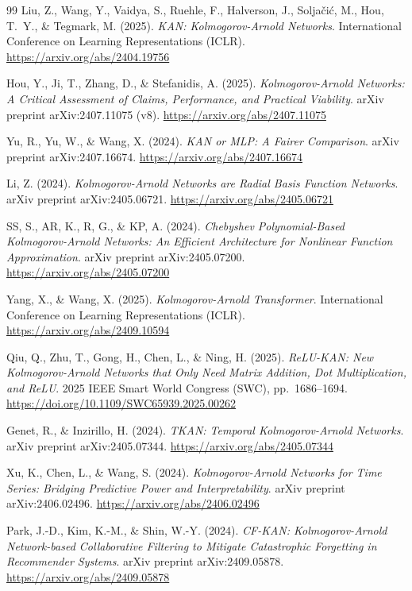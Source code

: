 \documentclass[12pt,a4paper]{report}
\begin{document}
\begin{thebibliography}{99}
Liu, Z., Wang, Y., Vaidya, S., Ruehle, F., Halverson, J., Solja\v{c}i\'{c}, M., Hou, T.~Y., \& Tegmark, M. (2025).
\textit{KAN: Kolmogorov-Arnold Networks}.
International Conference on Learning Representations (ICLR). \url{https://arxiv.org/abs/2404.19756}

Hou, Y., Ji, T., Zhang, D., \& Stefanidis, A. (2025).
\textit{Kolmogorov-Arnold Networks: A Critical Assessment of Claims, Performance, and Practical Viability}.
arXiv preprint arXiv:2407.11075 (v8). \url{https://arxiv.org/abs/2407.11075}

Yu, R., Yu, W., \& Wang, X. (2024).
\textit{KAN or MLP: A Fairer Comparison}.
arXiv preprint arXiv:2407.16674. \url{https://arxiv.org/abs/2407.16674}

Li, Z. (2024).
\textit{Kolmogorov-Arnold Networks are Radial Basis Function Networks}.
arXiv preprint arXiv:2405.06721. \url{https://arxiv.org/abs/2405.06721}

SS, S., AR, K., R, G., \& KP, A. (2024).
\textit{Chebyshev Polynomial-Based Kolmogorov-Arnold Networks: An Efficient Architecture for Nonlinear Function Approximation}.
arXiv preprint arXiv:2405.07200. \url{https://arxiv.org/abs/2405.07200}

Yang, X., \& Wang, X. (2025).
\textit{Kolmogorov-Arnold Transformer}.
International Conference on Learning Representations (ICLR). \url{https://arxiv.org/abs/2409.10594}

Qiu, Q., Zhu, T., Gong, H., Chen, L., \& Ning, H. (2025).
\textit{ReLU-KAN: New Kolmogorov-Arnold Networks that Only Need Matrix Addition, Dot Multiplication, and ReLU}.
2025 IEEE Smart World Congress (SWC), pp.\ 1686--1694. \url{https://doi.org/10.1109/SWC65939.2025.00262}

Genet, R., \& Inzirillo, H. (2024).
\textit{TKAN: Temporal Kolmogorov-Arnold Networks}.
arXiv preprint arXiv:2405.07344. \url{https://arxiv.org/abs/2405.07344}

Xu, K., Chen, L., \& Wang, S. (2024).
\textit{Kolmogorov-Arnold Networks for Time Series: Bridging Predictive Power and Interpretability}.
arXiv preprint arXiv:2406.02496. \url{https://arxiv.org/abs/2406.02496}

Park, J.-D., Kim, K.-M., \& Shin, W.-Y. (2024).
\textit{CF-KAN: Kolmogorov-Arnold Network-based Collaborative Filtering to Mitigate Catastrophic Forgetting in Recommender Systems}.
arXiv preprint arXiv:2409.05878. \url{https://arxiv.org/abs/2409.05878}


\end{thebibliography}
\end{document}
